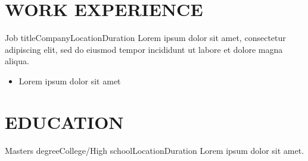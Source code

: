 \documentclass[10pt, a4paper]{article}
\begin{document}
\section{WORK EXPERIENCE}


\begin{cvitem}{Job title}{Company}{Location}{Duration}
Lorem ipsum dolor sit amet, consectetur adipiscing elit, sed do eiusmod tempor incididunt ut labore et dolore magna aliqua.
    \begin{itemize}
        \item Lorem ipsum dolor sit amet
    \end{itemize}
\end{cvitem}

\section{EDUCATION}


\begin{cvitem}{Masters degree}{College/High school}{Location}{Duration}
    Lorem ipsum dolor sit amet.
\end{cvitem}


\end{document}
